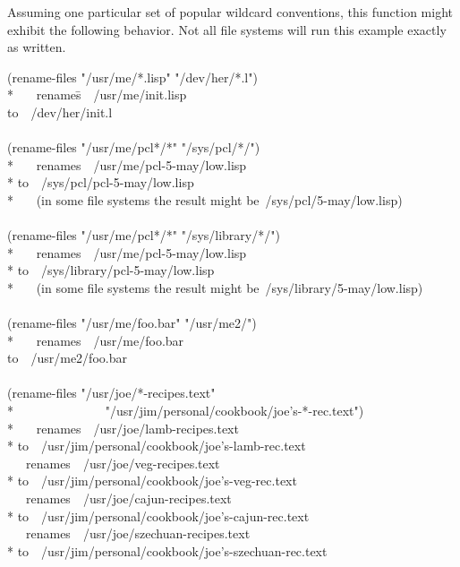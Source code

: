 Assuming one particular set of popular wildcard conventions,
this function might exhibit the following behavior.
Not all file systems will run this example exactly as written.
\begin{lisp}
(rename-files "/usr/me/*.lisp" "/dev/her/*.l") \\*
~~~\textrm{renames}\=~~/usr/me/init.lisp \\
\textrm{to}~~/dev/her/init.l \\
\\
(rename-files "/usr/me/pcl*/*" "/sys/pcl/*/") \\*
~~~\textrm{renames}~~/usr/me/pcl-5-may/low.lisp \\*
\textrm{to}~~/sys/pcl/pcl-5-may/low.lisp \\*
~~~\textrm{(in some file systems the result might be}~/sys/pcl/5-may/low.lisp\textrm{)} \\
\\
(rename-files "/usr/me/pcl*/*" "/sys/library/*/") \\*
~~~\textrm{renames}~~/usr/me/pcl-5-may/low.lisp \\*
\textrm{to}~~/sys/library/pcl-5-may/low.lisp \\*
~~~\textrm{(in some file systems the result might be}~/sys/library/5-may/low.lisp\textrm{)} \\
\\
(rename-files "/usr/me/foo.bar" "/usr/me2/") \\*
~~~\textrm{renames}~~/usr/me/foo.bar \\
\textrm{to}~~/usr/me2/foo.bar \\
\\
(rename-files "/usr/joe/*-recipes.text" \\*
~~~~~~~~~~~~~~"/usr/jim/personal/cookbook/joe's-*-rec.text") \\*
~~~\textrm{renames}~~/usr/joe/lamb-recipes.text \\*
\textrm{to}~~/usr/jim/personal/cookbook/joe's-lamb-rec.text~~~~ \\
~~~\textrm{renames}~~/usr/joe/veg-recipes.text \\*
\textrm{to}~~/usr/jim/personal/cookbook/joe's-veg-rec.text~~~~~ \\
~~~\textrm{renames}~~/usr/joe/cajun-recipes.text \\*
\textrm{to}~~/usr/jim/personal/cookbook/joe's-cajun-rec.text~~~ \\
~~~\textrm{renames}~~/usr/joe/szechuan-recipes.text \\*
\textrm{to}~~/usr/jim/personal/cookbook/joe's-szechuan-rec.text
\end{lisp}

